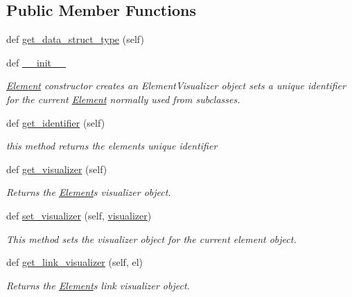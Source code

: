 \subsection*{Public Member Functions}
\begin{DoxyCompactItemize}
\item 
def \hyperlink{class_bridges_1_1element_1_1_element_aeb25959809a6c89fa7a1fcb55378e751}{get\+\_\+data\+\_\+struct\+\_\+type} (self)
\item 
def \hyperlink{class_bridges_1_1element_1_1_element_a85f37d5c7a6e8f45c200a5ee7c42eb6e}{\+\_\+\+\_\+init\+\_\+\+\_\+}
\begin{DoxyCompactList}\small\item\em \hyperlink{class_bridges_1_1element_1_1_element}{Element} constructor creates an Element\+Visualizer object sets a unique identifier for the current \hyperlink{class_bridges_1_1element_1_1_element}{Element} normally used from subclasses. \end{DoxyCompactList}\item 
def \hyperlink{class_bridges_1_1element_1_1_element_a01b3d0e57ce06b996629acdb1cfaafb6}{get\+\_\+identifier} (self)
\begin{DoxyCompactList}\small\item\em this method returns the element\textquotesingle{}s unique identifier \end{DoxyCompactList}\item 
def \hyperlink{class_bridges_1_1element_1_1_element_a0f9c10a5424253aa27f2737e9d1c5411}{get\+\_\+visualizer} (self)
\begin{DoxyCompactList}\small\item\em Returns the \hyperlink{class_bridges_1_1element_1_1_element}{Element}\textquotesingle{}s visualizer object. \end{DoxyCompactList}\item 
def \hyperlink{class_bridges_1_1element_1_1_element_a8147ac170339450e4c375fd66dd2f863}{set\+\_\+visualizer} (self, \hyperlink{class_bridges_1_1element_1_1_element_a929f63e3aaaeff971a1def438168559a}{visualizer})
\begin{DoxyCompactList}\small\item\em This method sets the visualizer object for the current element object. \end{DoxyCompactList}\item 
def \hyperlink{class_bridges_1_1element_1_1_element_af79b3fc0a157602a476b672e6ecd9dcb}{get\+\_\+link\+\_\+visualizer} (self, el)
\begin{DoxyCompactList}\small\item\em Returns the \hyperlink{class_bridges_1_1element_1_1_element}{Element}\textquotesingle{}s link visualizer object. \end{DoxyCompactList}\item 

\end{DoxyCompactItemize}
